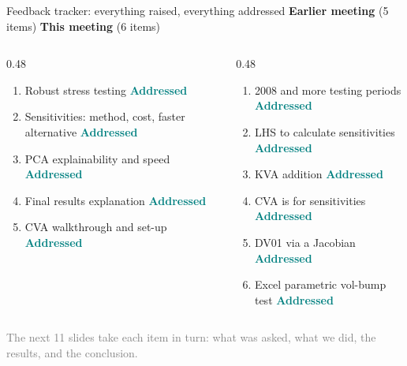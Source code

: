 \documentclass[9pt,aspectratio=169]{beamer}
\newcommand{\good}{\textcolor{teal}{\textbf{Addressed}}}
\begin{document}
\begin{frame}{Feedback tracker: everything raised, everything addressed}
  \small
  \textbf{Earlier meeting} (5 items) \hfill \textbf{This meeting} (6 items)
  \vspace{4pt}
  \begin{columns}[T]
    \begin{column}{0.48\textwidth}
      \begin{enumerate}
        \item Robust stress testing \good
        \item Sensitivities: method, cost, faster alternative \good
        \item PCA explainability and speed \good
        \item Final results explanation \good
        \item CVA walkthrough and set-up \good
      \end{enumerate}
    \end{column}
    \begin{column}{0.48\textwidth}
      \begin{enumerate}
        \item[6.] 2008 and more testing periods \good
        \item[7.] LHS to calculate sensitivities \good
        \item[8.] KVA addition \good
        \item[9.] CVA is for sensitivities \good
        \item[10.] DV01 via a Jacobian \good
        \item[11.] Excel parametric vol-bump test \good
      \end{enumerate}
    \end{column}
  \end{columns}
  \vspace{10pt}
  \centering \small \textcolor{grey}{The next 11 slides take each item in turn: what was asked, what we did, the results, and the conclusion.}
\end{frame}
\end{document}

